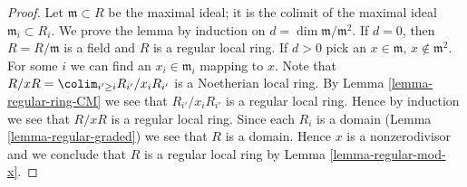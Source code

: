 \begin{proof}
Let $\mathfrak m \subset R$ be the maximal ideal; it is the colimit
of the maximal ideal $\mathfrak m_i \subset R_i$.
We prove the lemma by induction on $d = \dim \mathfrak m/\mathfrak m^2$.
If $d = 0$, then $R = R/\mathfrak m$ is a field and $R$ is a regular local ring.
If $d > 0$ pick an $x \in \mathfrak m$, $x \not \in \mathfrak m^2$.
For some $i$ we can find an $x_i \in \mathfrak m_i$ mapping to $x$.
Note that $R/xR = \colim_{i' \geq i} R_{i'}/x_iR_{i'}$ is a Noetherian
local ring. By
Lemma \ref{lemma-regular-ring-CM}
we see that $R_{i'}/x_iR_{i'}$ is a regular local ring.
Hence by induction we see
that $R/xR$ is a regular local ring. Since each $R_i$ is a domain
(Lemma \ref{lemma-regular-graded}) we see that $R$ is a domain.
Hence $x$ is a nonzerodivisor and we conclude that $R$ is
a regular local ring by Lemma \ref{lemma-regular-mod-x}.
\end{proof}





